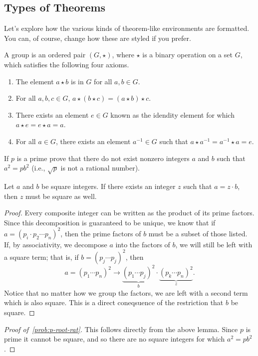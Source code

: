 \documentclass[code]{notes}
\begin{document}
	\subsection{Types of Theorems}
	Let's explore how the various kinds of theorem-like environments are formatted.
	You can, of course, change how these are styled if you prefer. \kant[1]
	\begin{definition}[Group]
		A group is an ordered pair $(G,\star)$, where $\star$ is a binary operation on a set $G$, which satisfies the following four axioms.
		\begin{enumerate}
			\item The element $a \star b$ is in $G$ for all $a,b \in G$.
			\item For all $a,b,c \in G$, $a \star (b \star c) = (a \star b) \star c$.
			\item There exists an element $e \in G$ known as the idendity element for which $a \star e = e \star a = a$.
			\item For all $a \in G$, there exists an element $a^{-1} \in G$ such that $a \star a^{-1} = a^{-1} \star a = e$.
		\end{enumerate}
	\end{definition}
	\kant[1]
	\begin{problem}\label{prob:p-root-rat}
			If $p$ is a prime prove that there do not exist nonzero integers $a$ and $b$ such that $a^2 = pb^2$ (i.e., $\sqrt{p}$ is not a rational number).
		\end{problem}
	\begin{lemma}
		Let $a$ and $b$ be square integers. If there exists an integer $z$ such that $a = z \cdot b$, then $z$ must be square as well.
	\end{lemma}
	\begin{proof}
		Every composite integer can be written as the product of its prime factors.
		Since this decomposition is guaranteed to be unique, we know that if $a = (p_i \cdot p_2 \cdots p_n)^2$, then the prime factors of $b$ must be a subset of those listed.
		If, by associativity, we decompose $a$ into the factors of $b$, we will still be left with a square term; that is, if $b = (p_j \cdots p_j)^2$, then 
		\[ a = (p_1 \cdots p_n)^2 \longrightarrow \underbrace{(p_1 \cdots p_j)^2}_{b} \cdot \underbrace{(p_k \cdots p_n)^2}_{z}. \]
		Notice that no matter how we group the factors, we are left with a second term which is also square.
		This is a direct coneqsuence of the restriction that $b$ be square.
	\end{proof}
	\begin{proof}[Proof of~\ref{prob:p-root-rat}]
	This follows directly from the above lemma. Since $p$ is prime it cannot be square, and so there are no square integers for which $a^2 = pb^2$.
	\end{proof}
	
\end{document}
